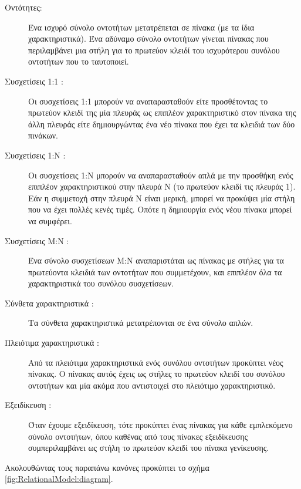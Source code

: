 \documentclass{assignment}
\begin{document}
\begin{description}

  \item[Οντότητες:] Ένα ισχυρό σύνολο οντοτήτων μετατρέπεται σε πίνακα (με τα ίδια χαρακτηριστικά). Ένα αδύναμο σύνολο οντοτήτων γίνεται πίνακας που περιλαμβάνει μια στήλη για το πρωτεύον κλειδί του ισχυρότερου συνόλου οντοτήτων που το ταυτοποιεί. 
  \item[Συσχετίσεις 1:1 :] Οι συσχετίσεις 1:1 μπορούν να αναπαρασταθούν είτε προσθέτοντας το πρωτεύον κλειδί της μία πλευράς ως επιπλέον χαρακτηριστικό στον πίνακα της άλλη πλευράς είτε δημιουργώντας ένα νέο πίνακα που έχει τα κλειδιά των δύο πινάκων.
  \item[Συσχετίσεις 1:Ν :] Οι συσχετίσεις 1:Ν μπορούν να αναπαρασταθούν απλά με την προσθήκη ενός επιπλέον χαρακτηριστικού στην πλευρά Ν (το πρωτεύον κλειδί τις πλευράς 1). Εάν η συμμετοχή στην πλευρά Ν είναι μερική, μπορεί να προκύψει μία στήλη που να έχει πολλές κενές τιμές. Οπότε η δημιουργία ενός νέου πίνακα μπορεί να συμφέρει.
  \item[Συσχετίσεις Μ:Ν :] Ένα σύνολο συσχετίσεων M:N αναπαριστάται ως πίνακας με στήλες για τα πρωτεύοντα κλειδιά των οντοτήτων που συμμετέχουν, και επιπλέον όλα τα χαρακτηριστικά του συνόλου συσχετίσεων. 
  \item[Σύνθετα χαρακτηριστικά :] Τα σύνθετα χαρακτηριστικά μετατρέπονται σε ένα σύνολο απλών.
  \item[Πλειότιμα χαρακτηριστικά :] Από τα πλειότιμα χαρακτηριστικά ενός συνόλου οντοτήτων προκύπτει νέος πίνακας. Ο πίνακας αυτός έχεις ως στήλες το πρωτεύον κλειδί του συνόλου οντοτήτων και μία ακόμα που αντιστοιχεί στο πλειότιμο χαρακτηριστικό.
  \item[Εξειδίκευση :] Όταν έχουμε εξειδίκευση, τότε προκύπτει ένας πίνακας για κάθε εμπλεκόμενο σύνολο οντοτήτων, όπου καθένας από τους πίνακες εξειδίκευσης συμπεριλαμβάνει ως στήλη το πρωτεύον κλειδί του πίνακα γενίκευσης.
 
\end{description}

Ακολουθώντας τους παραπάνω κανόνες προκύπτει το σχήμα \ref{fig:RelationalModel:diagram}.
\end{document}
